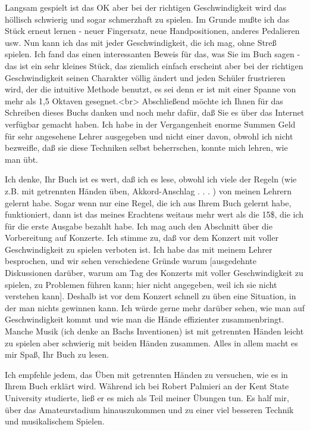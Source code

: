 Langsam gespielt ist das OK aber bei der richtigen Geschwindigkeit wird das höllisch schwierig und sogar schmerzhaft zu spielen.
Im Grunde mußte ich das Stück erneut lernen - neuer Fingersatz, neue Handpositionen, anderes Pedalieren usw.
Nun kann ich das mit jeder Geschwindigkeit, die ich mag, ohne Streß spielen.
Ich fand das einen interessanten Beweis für das, was Sie im Buch sagen - das ist ein sehr kleines Stück, das ziemlich einfach erscheint aber bei der richtigen Geschwindigkeit seinen Charakter völlig ändert und jeden Schüler frustrieren wird, der die intuitive Methode benutzt, es sei denn er ist mit einer Spanne von mehr als 1,5 Oktaven gesegnet.<br>
Abschließend möchte ich Ihnen für das Schreiben dieses Buchs danken und noch mehr dafür, daß Sie es über das Internet verfügbar gemacht haben.
Ich habe in der Vergangenheit enorme Summen Geld für sehr angesehene Lehrer ausgegeben und nicht einer davon, obwohl ich nicht bezweifle, daß sie diese Techniken selbst beherrschen, konnte mich lehren, wie man übt.


\item \hypertarget{testimonials10}{}
Ich denke, Ihr Buch ist es wert, daß ich es lese, obwohl ich viele der Regeln (wie z.B. mit getrennten Händen üben, Akkord-Anschlag . . . ) von meinen Lehrern gelernt habe.
Sogar wenn nur eine Regel, die ich aus Ihrem Buch gelernt habe, funktioniert, dann ist das meines Erachtens weitaus mehr wert als die 15\$, die ich für die erste Ausgabe bezahlt habe.
Ich mag auch den Abschnitt über die Vorbereitung auf Konzerte.
Ich stimme zu, daß vor dem Konzert mit voller Geschwindigkeit zu spielen verboten ist.
Ich habe das mit meinem Lehrer besprochen, und wir sehen verschiedene Gründe warum [ausgedehnte Diskussionen darüber, warum am Tag des Konzerts mit voller Geschwindigkeit zu spielen, zu Problemen führen kann; hier nicht angegeben, weil ich sie nicht verstehen kann].
Deshalb ist vor dem Konzert schnell zu üben eine Situation, in der man nichts gewinnen kann.
Ich würde gerne mehr darüber sehen, wie man auf Geschwindigkeit kommt und wie man die Hände effizienter zusammenbringt.
Manche Musik (ich denke an Bachs Inventionen) ist mit getrennten Händen leicht zu spielen aber schwierig mit beiden Händen zusammen.
Alles in allem macht es mir Spaß, Ihr Buch zu lesen.


\item \hypertarget{testimonials11}{}
Ich empfehle jedem, das Üben mit getrennten Händen zu versuchen, wie es in Ihrem Buch erklärt wird.
Während ich bei Robert Palmieri an der Kent State University studierte, ließ er es mich als Teil meiner Übungen tun.
Es half mir, über das Amateurstadium hinauszukommen und zu einer viel besseren Technik und musikalischem Spielen.


